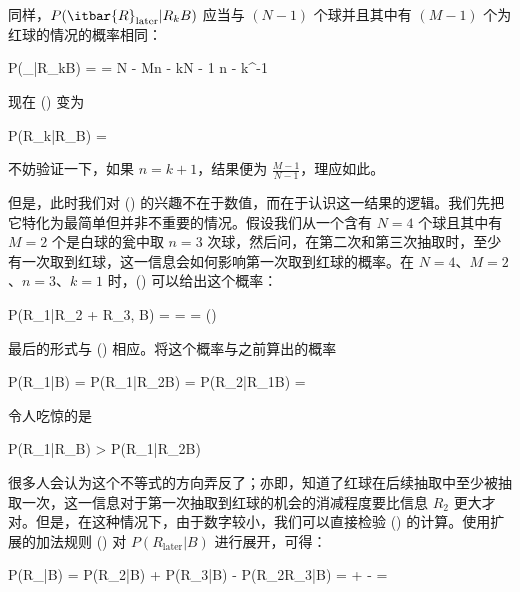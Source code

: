 同样，$P(\itbar{R}_{\text{later}}|R_kB)$ 应当与 $(N - 1)$ 个球并且其中有 $(M - 1)$ 个为红球的情况的概率相同：

\placeformula[3-55]
\startformula
P(_{}|R_kB) =  = \startpmatrix N - M\NR n - k\NR\stoppmatrix\startpmatrix N - 1 \NR n - k\NR\stoppmatrix^{-1}
\stopformula

现在 (\in[3-51]) 变为

\placeformula[3-56]
\startformula
P(R_k|R_{}B) = \times{}
\stopformula

不妨验证一下，如果 $n = k + 1$，结果便为 $\frac{M - 1}{N - 1}$，理应如此。

但是，此时我们对 (\in[3-56]) 的兴趣不在于数值，而在于认识这一结果的逻辑。我们先把它特化为最简单但并非不重要的情况。假设我们从一个含有 $N = 4$ 个球且其中有 $M = 2$ 个是白球的瓮中取 $n = 3$ 次球，然后问，在第二次和第三次抽取时，至少有一次取到红球，这一信息会如何影响第一次取到红球的概率。在 $N = 4$、$M = 2$、$n = 3$、$k = 1$ 时，(\in[3-56]) 可以给出这个概率：

\placeformula[3-57]
\startformula
P(R_1|R_2 + R_3, B) =  =  = \left(\right)
\stopformula

最后的形式与 (\in[3-51]) 相应。将这个概率与之前算出的概率

\placeformula[3-58]
\startformula
P(R_1|B) = \quad\quad P(R_1|R_2B) = P(R_2|R_1B) = 
\stopformula

令人吃惊的是

\placeformula[3-59]
\startformula
P(R_1|R_{}B) > P(R_1|R_2B)
\stopformula

很多人会认为这个不等式的方向弄反了；亦即，知道了红球在后续抽取中至少被抽取一次，这一信息对于第一次抽取到红球的机会的消减程度要比信息 $R_2$ 更大才对。但是，在这种情况下，由于数字较小，我们可以直接检验 (\in[3-51]) 的计算。使用扩展的加法规则 (\in[2-82]) 对 $P(R_{\text{later}}|B)$ 进行展开，可得：

\placeformula[3-60]
\startformula
\displaystyle
\startmathalignment
\NC P(R_{}|B) \NC = P(R_2|B) + P(R_3|B) - P(R_2R_3|B)\NR
\NC \NC =  +  - \times{} = \NR
\stopmathalignment
\stopformula


